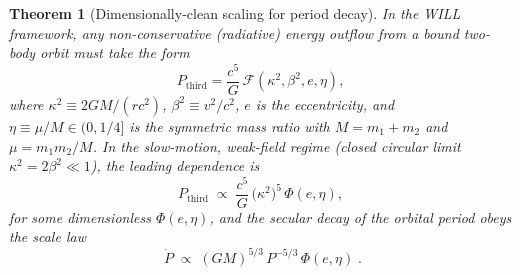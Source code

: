 \documentclass[12pt, a4paper]{article}
\newtheorem{theorem}{Theorem}[section]
\begin{document}
\begin{theorem}[Dimensionally-clean scaling for period decay]
In the WILL framework, any non-conservative (radiative) energy outflow from a bound two-body orbit must take the form
\[
P_{\text{third}}
=\frac{c^{5}}{G}\,\mathcal{F}\!\left(\kappa^{2},\beta^{2},e,\eta\right),
\]
where $\kappa^{2}\equiv 2GM/(rc^{2})$, $\beta^{2}\equiv v^{2}/c^{2}$, $e$ is the eccentricity, and $\eta\equiv \mu/M\in(0,1/4]$ is the symmetric mass ratio with $M=m_{1}+m_{2}$ and $\mu=m_{1}m_{2}/M$. In the slow-motion, weak-field regime (closed circular limit $\kappa^{2}=2\beta^{2}\ll1$), the leading dependence is
\[
P_{\text{third}}\;\propto\;\frac{c^{5}}{G}\,\bigl(\kappa^{2}\bigr)^{5}\,\Phi(e,\eta),
\]
for some dimensionless $\Phi(e,\eta)$, and the secular decay of the orbital period obeys the scale law
\[
\boxed{\;\dot P\;\propto\;(GM)^{5/3}\,P^{-5/3}\,\Phi(e,\eta)\; }.
\]
\end{theorem}
\end{document}
